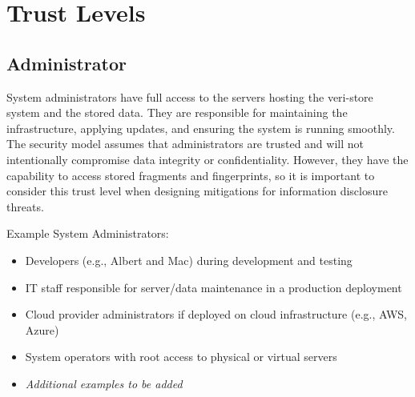 \documentclass[../veristore_security_model.tex]{subfiles}
\begin{document}
\section{Trust Levels}


\subsection{Administrator}

System administrators have full access to the servers hosting the veri-store system and the stored data. They are responsible for maintaining the infrastructure, applying updates, and ensuring the system is running smoothly. The security model assumes that administrators are trusted and will not intentionally compromise data integrity or confidentiality. However, they have the capability to access stored fragments and fingerprints, so it is important to consider this trust level when designing mitigations for information disclosure threats.
\vspace{1em}

\noindent Example System Administrators:
\begin{itemize}
    \item Developers (e.g., Albert and Mac) during development and testing
    \item IT staff responsible for server/data maintenance in a production deployment
    \item Cloud provider administrators if deployed on cloud infrastructure (e.g., AWS, Azure)
    \item System operators with root access to physical or virtual servers
    \item \textit{Additional examples to be added}
\end{itemize}
\end{document}
